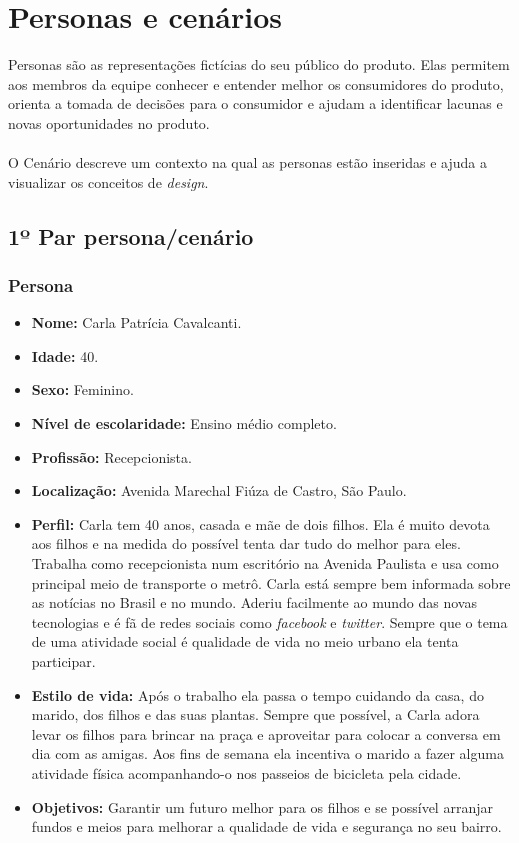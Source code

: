 \documentclass[a4paper,12pt,twoside]{report}
\begin{document}
\chapter{Personas e cenários}
Personas são as representações fictícias do seu público do produto. Elas permitem aos membros da equipe conhecer e entender melhor os consumidores do produto, orienta a tomada de decisões para o consumidor e ajudam a identificar lacunas e novas oportunidades no produto.\cite{R0}
\\~\\
O Cenário descreve um contexto na qual as personas estão inseridas e ajuda a visualizar os conceitos de \textit{design}.\cite{R0}

\section{1º Par persona/cenário}
\subsection{Persona}
\begin{itemize}
\item \textbf{Nome:} Carla Patrícia Cavalcanti.
\item \textbf{Idade:} 40.
\item \textbf{Sexo:} Feminino.
\item \textbf{Nível de escolaridade:} Ensino médio completo.
\item \textbf{Profissão:} Recepcionista.
\item \textbf{Localização:} Avenida Marechal Fiúza de Castro, São Paulo.
\item \textbf{Perfil:} Carla tem 40 anos, casada e mãe de dois filhos. Ela é muito devota aos filhos e na medida do possível tenta dar tudo do melhor para eles. Trabalha como recepcionista num escritório na Avenida Paulista e usa como principal meio de transporte o metrô. Carla está sempre bem informada sobre as notícias no Brasil e no mundo. Aderiu facilmente ao mundo das novas tecnologias e é fã de redes sociais como \textit{facebook} e \textit{twitter}. Sempre que o tema de uma atividade social é qualidade de vida no meio urbano ela tenta participar.
\item \textbf{Estilo de vida:} Após o trabalho ela passa o tempo cuidando da casa, do marido, dos filhos e das suas plantas. Sempre que possível, a Carla adora levar os filhos para brincar na praça e aproveitar para colocar a conversa em dia com as amigas. Aos fins de semana ela incentiva o marido a fazer alguma atividade física acompanhando-o nos passeios de bicicleta pela cidade.
\item \textbf{Objetivos:} Garantir um futuro melhor para os filhos e se possível arranjar fundos e meios para melhorar a qualidade de vida e segurança no seu bairro.
\end{itemize}
\end{document}
